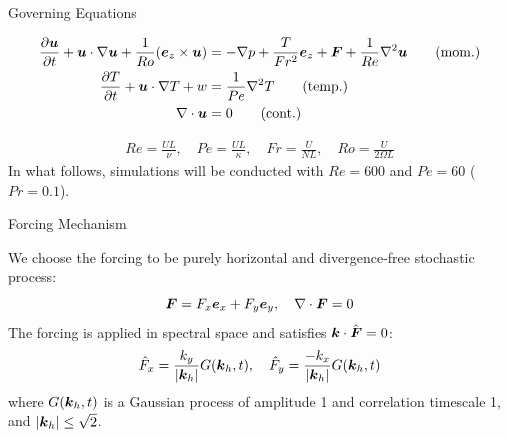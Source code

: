 \documentclass[aspecttatio=169]{beamer}
\begin{document}
\begin{frame}{Governing Equations}

    {\small
    \begin{align}
        \frac{\partial \boldsymbol{u}}{\partial t} + \boldsymbol{u} \cdot \nabla \boldsymbol{u} +
        \frac{1}{Ro}(\boldsymbol{e}_z \times
        \boldsymbol{u}) &= -\nabla p +
        \frac{T}{Fr^2}\boldsymbol{e}_z + \boldsymbol{F} + \frac{1}{Re}\nabla^2\boldsymbol{u} \tag{mom.}\label{eq:momentum}\\
        \frac{\partial T}{\partial t} + \boldsymbol{u} \cdot \nabla T + w &= \frac{1}{Pe}\nabla^2T \tag{temp.} \label{eq:temp} \\
        \nabla \cdot \boldsymbol{u} &= 0 \tag{cont.}\label{eq:cont}
    \end{align}
    
    \begin{align*}
        Re = \frac{UL}{\nu}, \quad Pe = \frac{UL}{\kappa}, \quad Fr =
        \frac{U}{NL}, \quad Ro = \frac{U}{2\Omega L}
    \end{align*}
    In what follows, simulations will be conducted with $Re = 600$ and $Pe = 60$
    ($Pr = 0.1$).
    }

\end{frame}

\begin{frame}{Forcing Mechanism}

    We choose the forcing to be purely horizontal and divergence-free stochastic
    process:
    \[
        \boldsymbol{F} = F_x\boldsymbol{e}_x + F_y\boldsymbol{e}_y, \quad \nabla \cdot \boldsymbol{F} = 0
    \]
    The forcing is applied in spectral space and satisfies $\boldsymbol{k} \cdot \hat{\boldsymbol{F}} = 0$:
    \begin{gather*}
        \hat{F}_x = \frac{k_y}{|\boldsymbol{k}_h|}G(\boldsymbol{k}_h,t), \quad \hat{F}_y = \frac{-k_x}{|\boldsymbol{k}_h|}G(\boldsymbol{k}_h,t)\\
    \end{gather*}
    where $G(\boldsymbol{k}_h,t)$ is a Gaussian process of amplitude 1 and correlation
    timescale 1, and $|\boldsymbol{k}_h| \le \sqrt{2}$. 


\end{frame}
\end{document}
